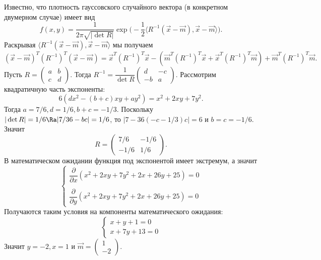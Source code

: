 \begin{solution}
    Известно, что плотность гауссовского случайного вектора (в конкретном двумерном случае) имеет вид
    \[
        f(x, y) = \dfrac{1}{2\pi \sqrt{|\det R|}}\exp \biggr(-\dfrac{1}{2}\langle R^{-1}(\vec{x} - \vec{m}), \vec{x} - \vec{m} \rangle\biggr).
    \]
    Раскрывая $\langle R^{-1}(\vec{x} - \vec{m}), \vec{x} - \vec{m} \rangle$ мы получаем
    \[
        (\vec{x} - \vec{m})^T (R^{-1})^T (\vec{x} - \vec{m}) = \vec{x}^T (R^{-1})^T \vec{x} - (\vec{m}^T (R^{-1})^T \vec{x} + \vec{x}^T (R^{-1})^T \vec{m}) + \vec{m}^T (R^{-1})^T \vec{m}.
    \]
    Пусть $R = \begin{pmatrix*} a & b \\ c & d
    \end{pmatrix*}.$
    Тогда $R^{-1} = \dfrac{1}{\det R}\begin{pmatrix*} d & -c \\ -b & a
    \end{pmatrix*}.$
    Рассмотрим квадратичную часть экспоненты:
    \[
        6(dx^2 - (b + c)xy + ay^2) = x^2 + 2xy + 7y^2.
    \]
    Тогда $a = 7/6, d = 1/6, b + c = -1/3$.
    Поскольку $|\det R| = 1/6 \Ra |7/36 - bc| = 1/6$, то $|7 - 36(-c - 1/3)c| = 6$ и $b = c = -1/6$.
    Значит \[ R =
               \begin{pmatrix*}
                   7/6 & -1/6 \\ -1/6 & 1/6
               \end{pmatrix*}.
    \]
    В математическом ожидании функция под экспонентой имеет экстремум, а значит
    \[
        \begin{cases}
            \dfrac{\partial}{\partial x} (x^2 + 2xy + 7y^2 + 2x + 26y + 25) = 0 \\ \\
            \dfrac{\partial}{\partial y} (x^2 + 2xy + 7y^2 + 2x + 26y + 25) = 0
        \end{cases}
    \]
    Получаются таким условия на компоненты математического ожидания:
    \[
        \begin{cases}
            x + y + 1 = 0 \\
            x + 7y + 13 = 0
        \end{cases}
    \]
    Значит $y = -2, x = 1$ и $\vec{m} = \begin{pmatrix*} 1 \\ -2
    \end{pmatrix*}$.
\end{solution}
